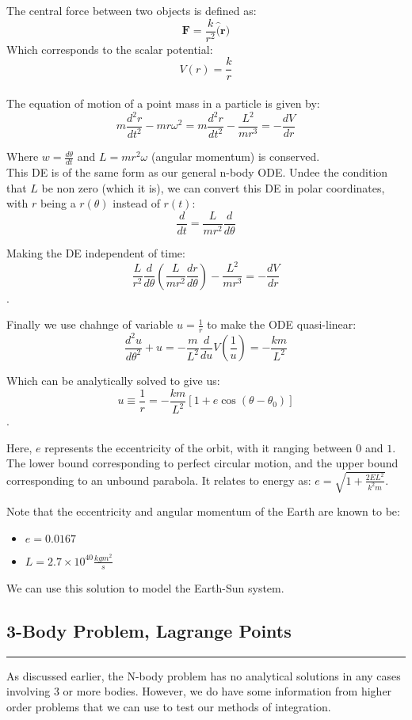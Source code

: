 \documentclass[hidelinks, 11pt, dvipsnames]{article}
\newcommand{\psubsection}[1]{{
    \begin{center}
            \section*{\Large #1}
        \noindent \rule{17cm}{0.2pt}
    \end{center}
}}
\begin{document}
The central force between two objects is defined as:
$$ \mathbf{F} = \frac{k}{r^2} \mathbf{\hat(r)} $$
Which corresponds to the scalar potential:
$$ V(r) = \frac{k}{r} $$\\
The equation of motion of a point mass in a particle is given by:
$$ m\frac{d^2 r}{dt^2} - mr \omega^2 = 
m\frac{d^2 r}{dt^2} - \frac{L^2}{mr^3} = -\frac{dV}{dr} $$

Where $w = \frac{d\theta}{dt}$ and $L= mr^2 \omega$ (angular momentum) is conserved.\\

This DE is of the same form as our general n-body ODE. Undee the condition that $L$ be non zero (which it is), we can convert this DE in polar coordinates, with $r$ being a $r(\theta)$ instead of $r(t)$:
$$ \frac{d}{dt} = \frac{L}{mr^{2}} \frac{d}{d\theta} $$

Making the DE independent of time:
$$ \frac{L}{r^2} \frac{d}{d\theta} \left( \frac{L}{mr^2} \frac{dr}{d\theta} \right)- \frac{L^2}{mr^3} = -\frac{dV}{dr} $$.

Finally we use chahnge of variable $u = \frac{1}{r}$ to make the ODE quasi-linear:
$$ \frac{d^2 u}{d\theta^2} + u = -\frac{m}{L^2}  \frac{d}{du} V\left( \frac 1 u\right) = -\frac{km}{L^2} $$

Which can be analytically solved to give us:
$$u \equiv \frac{1}{r} = -\frac{km}{L^2} \left[ 1 + e \cos(\theta - \theta_0) \right]
$$.

Here, $e$ represents the eccentricity of the orbit, with it ranging between $0$ and $1$. The lower bound corresponding to perfect circular motion, and the upper bound corresponding to an unbound parabola. It relates to energy as:
$e = \sqrt{1 + \frac{2EL^2}{k^2 m}}$. 

Note that the eccentricity and angular momentum of the Earth are known to be:
\begin{itemize}
    \item $e = 0.0167$
    \item $L =  2.7\times10^{40} \frac{kg m^2}{s}$
\end{itemize}

We can use this solution to model the Earth-Sun system. 

\psubsection{3-Body Problem, Lagrange Points}
As discussed earlier, the N-body problem has no analytical solutions in any cases involving 3 or more bodies. However, we do have some information from higher order problems that we can use to test our methods of integration. 
\end{document}
